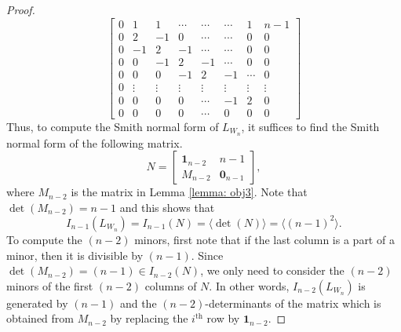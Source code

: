 \documentclass[11pt,reqno]{amsart}
\newcommand{\angles}[1]{\langle #1 \rangle}
\theoremstyle{definition}
\theoremstyle{plain}
\begin{document}
\begin{proof}
\begin{equation}
\left[\begin{array}{c|ccccccc}
	0  & 1 & 1 & \cdots & \cdots & \cdots & 1 & n-1 \\
	\hline
	0  & 2 & -1 & 0 & \cdots & \cdots & 0 & 0 \\
	0  & - 1& 2 & -1 & \cdots & \cdots & 0 & 0 \\
	0  & 0 & - 1& 2 & -1 & \cdots & 0 & 0 \\
	0  & 0 & 0 & - 1& 2 & -1 & \cdots & 0 \\
		0  & \vdots & \vdots &\vdots & \vdots& \vdots& \vdots& \vdots\\
	0  & 0 & 0 & 0 & \cdots & -1& 2 & 0 \\
	0 & 0 & 0 & 0 & \cdots& 0 & 0 & 0
\end{array} \right]
\end{equation}
\noindent Thus, to compute the Smith normal form of $L_{W_n}$, it suffices to find the Smith normal form of the following matrix.
\begin{equation*}
	N = \left[
	\begin{array}{c|c}
		\mathbf{1}_{n-2} & n-1 \\
		\hline
		M_{n-2} & \mathbf{0}_{n-1}
	\end{array}
	\right],
\end{equation*}
where $M_{n-2}$ is the matrix in Lemma \ref{lemma: obj3}. 
Note that $\det(M_{n-2}) = n-1$ and this shows that
\[
I_{n-1}(L_{W_n}) = I_{n-1}(N) =\angles{\det(N)}=\angles{(n-1)^2}.
\] 
To compute the $(n-2)$ minors, first note that if the last column is a part of a minor, then it is divisible by $(n-1)$. 
Since $\det(M_{n-2}) = (n-1) \in I_{n-2}(N)$, we only need to consider the $(n-2)$ minors of the first $(n-2)$ columns of $N$. In other words, $I_{n-2}(L_{W_n})$ is generated by $(n-1)$ 
and the $(n-2)$-determinants of the matrix which is obtained from $M_{n-2}$ by replacing the $i^{\textrm{th}}$ row by $\mathbf{1}_{n-2}$.


\end{proof}
\end{document}
